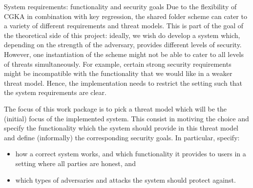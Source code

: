 \documentclass[E]{BAMASA}
\begin{document}
\begin{workpackage}{System requirements: functionality and security goals}\label{wp:system-reqs}
    Due to the flexibility of CGKA in combination with key regression, the shared folder scheme 
    can cater to a variety of different requirements and threat models.
    This is part of the goal of the theoretical side of this project: 
    ideally, we wish do develop a system which, depending on the strength of the adversary, 
    provides different levels of security.
    However, one instantiation of the scheme might not be able to cater to all levels of threats 
    simultaneously.
    For example, certain strong security requirements might be incompatible with the functionality 
    that we would like in a weaker threat model.
    Hence, the implementation needs to restrict the setting such that the system requirements are clear.
    
    The focus of this work package is to pick a threat model which will be the (initial) focus 
    of the implemented system.
    This consist in motiving the choice and specify the functionality which the system should provide 
    in this threat model and define (informally) the corresponding security goals.
    In particular, specify:
    \begin{itemize}
        \item how a correct system works, and which functionality it provides to users in a setting 
                where all parties are honest, and
        \item which types of adversaries and attacks the system should protect against.
    \end{itemize}
\end{workpackage}
\end{document}
